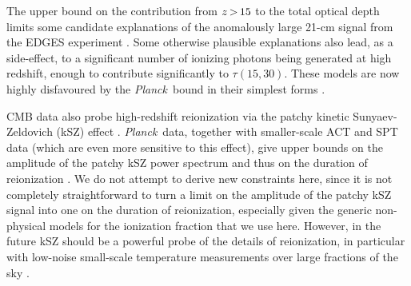 \documentclass[longauth,traditabstract]{aa}
\def\Planck{\textit{Planck}}
\def\,{\thinspace}
\begin{document}
The upper bound on the contribution from $z\,{>}\,15$ to the total optical depth
limits some candidate explanations of the anomalously large 21-cm signal from
the EDGES experiment \citep{bowman2018}. Some otherwise plausible explanations
also lead, as a side-effect, to a significant number of ionizing photons being
generated at high redshift, enough to contribute significantly to $\tau(15,30)$.
These models are now highly disfavoured by the \Planck\ bound in their simplest
forms \citep[see e.g.,][]{Ewall-Wice:2018bzf}.

CMB data also probe high-redshift reionization via the patchy kinetic
Sunyaev-Zeldovich (kSZ) effect \citep{gruzinov1998, Knox:1998fp}. \Planck\ data,
together with smaller-scale ACT and SPT data (which are even more sensitive to this
effect), give upper bounds on the amplitude of the patchy kSZ power spectrum and
thus on the duration of reionization \citep{zahn2012, Sievers:2013ica,
planck2014-a25}. We do not attempt to derive new constraints here,
since it is not completely straightforward to turn a limit on the amplitude
of the patchy kSZ signal into one on the duration of reionization, especially
given the generic non-physical models for the ionization fraction
that we use here. However, in
the future kSZ should be a powerful probe of the details of reionization,
in particular with low-noise small-scale temperature measurements over large
fractions of the sky \citep{Smith:2016lnt,Ferraro:2018izc}.
\end{document}
